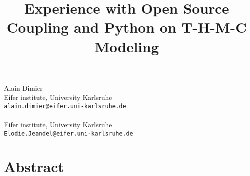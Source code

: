 \title{Experience with Open Source Coupling and Python on T-H-M-C Modeling}
 \author{} \institute{}
\maketitle
\begin{center}
{\large Alain Dimier}\\
Eifer institute, University Karlsruhe\\
{\tt alain.dimier@eifer.uni-karlsruhe.de}
\\ \vspace{4mm}{\large Elodie Jeandel}\\
Eifer institute, University Karlsruhe\\
{\tt Elodie.Jeandel@eifer.uni-karlsruhe.de}

\end{center}

\section*{Abstract}


